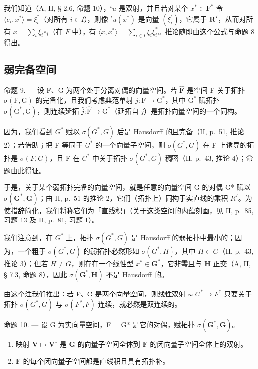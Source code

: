 我们知道（A, II, § 2.6, 命题 10），\({}^t u\) 是双射，并且若对某个 \(x^* \in \mathbf{F}^*\) 令 \(\langle e_i, x^* \rangle = \xi_i^*\)（对所有 \(i \in I\)），则像 \({}^t u(x^*)\) 是向量 \((\xi_i^*)\)，它属于 \(\mathbf{R}^I\)，从而对所有 \(x = \sum_{i} \xi_i e_i\)（在 \(F\) 中），有 \(\langle x, x^* \rangle = \sum_{i \in I} \xi_i \xi_i^*\)。推论随即由这个公式与命题 8 得出。

\subsection{弱完备空间}

命题 9. --- 设 F、G 为两个处于分离对偶的向量空间。若 \(\hat{\mathbf{F}}\) 是空间 F 关于拓扑 \(\sigma(\mathrm{F},\mathrm{G})\) 的完备化，且我们考虑典范单射 \(j:\mathrm{F}\to\mathrm{G}^{*}\)，其中 \(\mathrm{G}^{*}\) 赋拓扑 \(\sigma(\mathrm{G}^{*},\mathrm{G})\)，则连续延拓 \(\hat{j}:\hat{\mathrm{F}}\to\mathrm{G}^{*}\)（延拓自 \(j\)）是拓扑向量空间的一个同构。

因为，我们看到 \(G^{*}\) 赋以 \(\sigma(G^{*}, G)\) 后是 Hausdorff 的且完备（II, p.~51, 推论 2）；若借助 j 把 F 等同于 \(G^{*}\) 的一个向量子空间，则 \(\sigma(G^{*}, G)\) 在 F 上诱导的拓扑是 \(\sigma(F, G)\)，且 F 在 \(G^{*}\) 中关于拓扑 \(\sigma(G^{*}, G)\) 稠密（II, p.~43, 推论 4）；命题由此得证。

于是，关于某个弱拓扑完备的向量空间，就是任意的向量空间 G 的对偶 G* 赋以 \(\sigma(\mathbf{G}^{*}, \mathbf{G})\)；由 II, p.~51 的推论 2，它们（拓扑上）同构于实直线的乘积 \(R^{I}\)。为使措辞简化，我们将称它们为「直线积」（关于这类空间的内蕴刻画，见 II, p.~85, 习题 13 及 II, p.~81, 习题 1）。

我们注意到，在 \(G^{*}\) 上，拓扑 \(\sigma(G^{*}, G)\) 是 Hausdorff 的弱拓扑中最小的；因为，一个粗于 \(\sigma(G^{*}, G)\) 的弱拓扑必然形如 \(\sigma(G^{*}, H)\)，其中 \(H \subset G\)（II, p.~43, 推论 3）；但若 \(H \neq G\)，则存在一个线性型 \(x^{*} \in \mathbf{G}^{*}\)，它非零且与 \(\mathbf{H}\) 正交（A, II, § 7.3, 命题 8），因此 \(\sigma(\mathbf{G}^{*}, \mathbf{H})\) 不是 Hausdorff 的。

由这个注我们推出：若 F、G 是两个向量空间，则线性双射 \(u:G^{*}\to F^{*}\) 只要关于拓扑 \(\sigma(G^{*},G)\) 与 \(\sigma(F^{*},F)\) 连续，就必然是双连续的。

命题 10. --- 设 G 为实向量空间，F = G* 是它的对偶，赋拓扑 \(\sigma(\mathbf{G}^*, \mathbf{G})\)。

\begin{enumerate}
\def\labelenumi{(\roman{enumi})}
\item
  映射 \(\mathbf{V} \mapsto \mathbf{V}^{\circ}\) 是 \(\mathbf{G}\) 的向量子空间全体到 \(\mathbf{F}\) 的闭向量子空间全体上的双射。
\item
  \(\mathbf{F}\) 的每个闭向量子空间都是直线积且具有拓扑补。
\end{enumerate}

